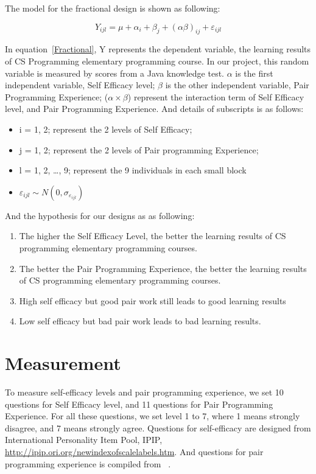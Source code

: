 \documentclass{sigchi}
\begin{document}
The model for the fractional design is shown as following:

\begin{equation}
\label{Fractional}
Y_{ijl} = \mu + \alpha_i + \beta_j + (\alpha \beta)_{ij} + \varepsilon_{ijl}
\end{equation}

In equation~\eqref{Fractional},   Y represents the dependent variable, the learning results of CS Programming elementary programming course. In our project, this random variable is measured by scores from a Java knowledge test. $\alpha$ is the first independent variable, Self Efficacy level;  $\beta$ is the other independent variable, Pair Programming Experience; ($\alpha \times \beta$) represent the interaction term of Self Efficacy level, and Pair Programming Experience. And details of subscripts is as follows:

\begin{itemize}
\item i = 1, 2; represent the 2 levels of Self Efficacy; 
\item j = 1, 2; represent the 2 levels of Pair programming Experience;
\item l = 1, 2, …, 9; represent the 9 individuals in each small block
\item $\varepsilon_{ijl} \sim  N(0, \sigma_{\varepsilon_{ijl}})$
\end{itemize}

And the hypothesis for our designs as as following:

\begin{enumerate}
\item The higher the Self Efficacy Level, the better the learning results of CS programming elementary programming courses. 
\item The better the Pair Programming Experience, the better the learning results of CS programming elementary programming courses. 
\item High self efficacy but good pair work still leads to good learning results
\item Low self efficacy but bad pair work leads to bad learning results.
\end{enumerate}


\section{Measurement}
To measure self-efficacy levels and pair programming experience,
we set 10 questions for Self Efficacy level, and 11 questions for Pair Programming Experience. For all these questions, we set level 1 to 7, where 1 means strongly disagree, and 7 means strongly agree. Questions for self-efficacy are designed from International Personality Item Pool, IPIP, \url{http://ipip.ori.org/newindexofscalelabels.htm}. And questions for pair programming experience is compiled from ~\cite{salleh2014investigating}.
\end{document}
